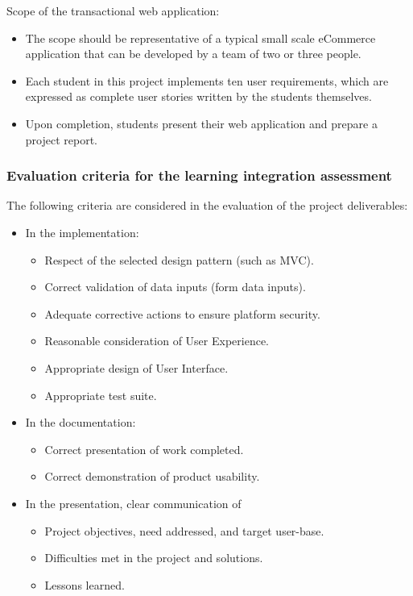 \documentclass[
  10pt,
]{article}
\providecommand{\tightlist}{%
  \setlength{\itemsep}{0pt}\setlength{\parskip}{0pt}}
\begin{document}
Scope of the transactional web application:

\begin{itemize}
\item
  The scope should be representative of a typical small scale eCommerce
  application that can be developed by a team of two or three people.
\item
  Each student in this project implements ten user requirements, which
  are expressed as complete user stories written by the students
  themselves.
\item
  Upon completion, students present their web application and prepare a
  project report.
\end{itemize}

\hypertarget{evaluation-criteria-for-the-learning-integration-assessment}{%
\subsubsection*{Evaluation criteria for the learning integration
assessment}\label{evaluation-criteria-for-the-learning-integration-assessment}}

The following criteria are considered in the evaluation of the project
deliverables:

\begin{itemize}
\tightlist
\item
  In the implementation:

  \begin{itemize}
  \tightlist
  \item
    Respect of the selected design pattern (such as MVC).
  \item
    Correct validation of data inputs (form data inputs).
  \item
    Adequate corrective actions to ensure platform security.
  \item
    Reasonable consideration of User Experience.
  \item
    Appropriate design of User Interface.
  \item
    Appropriate test suite.
  \end{itemize}
\item
  In the documentation:

  \begin{itemize}
  \tightlist
  \item
    Correct presentation of work completed.
  \item
    Correct demonstration of product usability.
  \end{itemize}
\item
  In the presentation, clear communication of

  \begin{itemize}
  \tightlist
  \item
    Project objectives, need addressed, and target user-base.
  \item
    Difficulties met in the project and solutions.
  \item
    Lessons learned.
  \end{itemize}
\end{itemize}
\end{document}
